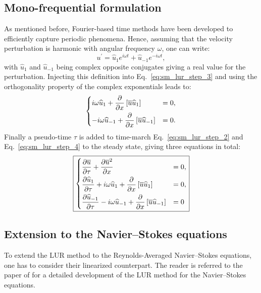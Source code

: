 \subsection{Mono-frequential formulation}
As mentioned before, Fourier-based time methods have been developed to efficiently
capture periodic phenomena.
Hence, assuming that the velocity perturbation is harmonic with 
angular frequency $\omega$, one can write:
\begin{equation}
	u^\prime = \widehat{u}_1 e^{i \omega t} + \widehat{u}_{-1} e^{-i \omega t},
\end{equation}
with $\widehat{u}_1$ and $\widehat{u}_{-1}$ being complex opposite conjugates giving a
real value for the perturbation.
Injecting this definition into Eq.~\eqref{eq:sm_lur_step_3} and using
the orthogonality property of the complex exponentials leads
to:
\begin{equation}
	\begin{dcases}
		i \omega \widehat{u}_1 +
		\frac{\partial}{\partial x} \left[
		\overline{u} \widehat{u}_1 \right] &= 
		0, \\
		-i \omega \widehat{u}_{-1} +
		\frac{\partial}{\partial x} \left[
		\overline{u} \widehat{u}_{-1} \right] &= 
		0.
	\end{dcases}
	\label{eq:sm_lur_step_4}
\end{equation}
Finally a pseudo-time $\tau$ is added to time-march 
Eq.~\eqref{eq:sm_lur_step_2} and Eq.~\eqref{eq:sm_lur_step_4}
to the steady state, giving three equations in total:
\begin{alignat}{2}
	\fbox{$
	\begin{dcases}
		\frac{\partial \overline{u}}{\partial \tau} +
		\frac{\partial 
			\overline{u}^2}{\partial x} &= 0, \\
		\frac{\partial \widehat{u}_1}{\partial \tau} +
		i \omega \widehat{u}_1 +
			\frac{\partial}{\partial x} \left[
			\overline{u} \widehat{u}_1 \right] &= 
			0, \\
		\frac{\partial \widehat{u}_{-1}}{\partial \tau}
		-i \omega \widehat{u}_{-1} +
			\frac{\partial}{\partial x} \left[
			\overline{u} \widehat{u}_{-1} \right] &= 
			0
	\end{dcases}
	$}
\end{alignat}

\subsection{Extension to the Navier--Stokes equations}
To extend the LUR method to the Reynolds-Averaged
Navier--Stokes equations, one has to consider
their linearized counterpart.
The reader is referred to the paper of \citet{Clark2000} for
a detailed development of the LUR method for the Navier--Stokes
equations.

